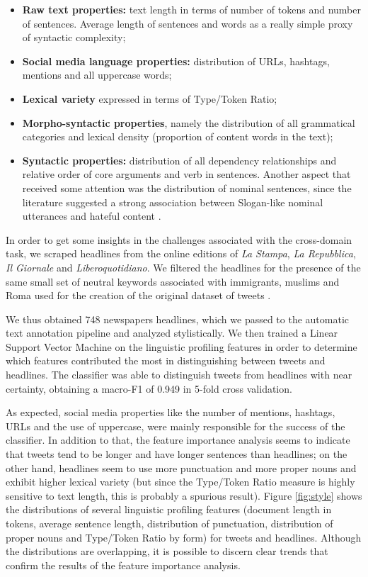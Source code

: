 \begin{itemize}
    \item{\textbf{Raw text properties:}} text length in terms of number of tokens and number of sentences. Average length of sentences and words as a really simple proxy of syntactic complexity;
    \item{\textbf{Social media language properties:}} distribution of URLs, hashtags, mentions and all uppercase words;
    \item{\textbf{Lexical variety}} expressed in terms of Type/Token Ratio;
    \item{\textbf{Morpho-syntactic properties}}, namely the distribution of all grammatical categories and lexical density (proportion of content words in the text);
    \item{\textbf{Syntactic properties:}} distribution of all dependency relationships and relative order of core arguments and verb in sentences. Another aspect that received some attention was the distribution of nominal sentences, since the literature suggested a strong association between Slogan-like nominal utterances and hateful content \cite{comandini_nominal_utterances}.
\end{itemize}

In order to get some insights in the challenges associated with the cross-domain task, we scraped headlines from the online editions of \emph{La Stampa}, \emph{La Repubblica}, \emph{Il Giornale} and \emph{Liberoquotidiano}.
We filtered the headlines for the presence of the same small set of neutral keywords associated with immigrants, muslims and Roma used for the creation of the original dataset of tweets \cite{poletto_hate_2017}.

We thus obtained 748 newspapers headlines, which we passed to the automatic text annotation pipeline and analyzed stylistically.
We then trained a Linear Support Vector Machine on the linguistic profiling features in order to determine which features contributed the most in distinguishing between tweets and headlines. The classifier was able to distinguish tweets from headlines with near certainty, obtaining a macro-F1 of 0.949 in 5-fold cross validation.

As expected, social media properties like the number of mentions, hashtags, URLs and the use of uppercase, were mainly responsible for the success of the classifier. In addition to that, the feature importance analysis seems to indicate that tweets tend to be longer and have longer sentences than headlines; on the other hand, headlines seem to use more punctuation and more proper nouns and exhibit higher lexical variety (but since the Type/Token Ratio measure is highly sensitive to text length, this is probably a spurious result).
Figure \ref{fig:style} shows the distributions of several linguistic profiling features (document length in tokens, average sentence length, distribution of punctuation, distribution of proper nouns and Type/Token Ratio by form) for tweets and headlines.
Although the distributions are overlapping, it is possible to discern clear trends that confirm the results of the feature importance analysis.

